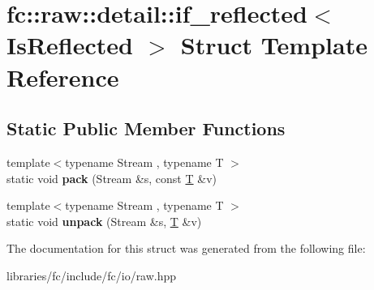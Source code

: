 \hypertarget{structfc_1_1raw_1_1detail_1_1if__reflected}{}\section{fc\+:\+:raw\+:\+:detail\+:\+:if\+\_\+reflected$<$ Is\+Reflected $>$ Struct Template Reference}
\label{structfc_1_1raw_1_1detail_1_1if__reflected}
\subsection*{Static Public Member Functions}
\begin{DoxyCompactItemize}
\item 
\mbox{\label{structfc_1_1raw_1_1detail_1_1if__reflected_ac2d73d096d2f865f4e9483c7d9c3703d}} 
{\footnotesize template$<$typename Stream , typename T $>$ }\\static void {\bfseries pack} (Stream \&s, const \mbox{\hyperlink{struct_t}{T}} \&v)
\item 
\mbox{\label{structfc_1_1raw_1_1detail_1_1if__reflected_ac7a19a5930ddcbc211e24ce4de6ab9fa}} 
{\footnotesize template$<$typename Stream , typename T $>$ }\\static void {\bfseries unpack} (Stream \&s, \mbox{\hyperlink{struct_t}{T}} \&v)
\end{DoxyCompactItemize}


The documentation for this struct was generated from the following file\+:\begin{DoxyCompactItemize}
\item 
libraries/fc/include/fc/io/raw.\+hpp\end{DoxyCompactItemize}
